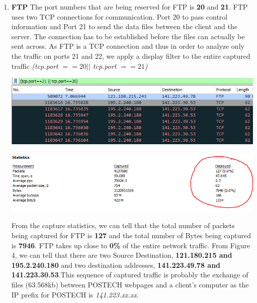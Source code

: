 \documentclass[a4paper,11pt]{article}
\begin{document}
\begin{enumerate}
	\item \textbf{FTP}
	\newline
	The port numbers that are being reserved for FTP is \textbf{20} and \textbf{21}. FTP uses two TCP connections for communication. Port 20 to pass control information and Port 21 to send the data files between the client and the server. The connection has to be established before the files can actually be sent across. As FTP is a TCP connection and thus in order to analyze only the traffic on ports 21 and 22, we apply a display filter to the entire captured traffic \textit{(tcp.port $== 20 || $ tcp.port $== 21$)}\newline
	\begin{minipage}{3in}
	\centering
		\includegraphics[width = 16cm]{ftpfilter}
		\captionsetup{justification=centering}
	\end{minipage}
	\newline\newline
	\begin{minipage}{5in}
	\centering
		\includegraphics[width = 16cm]{ftppacketsnbytes}
		\captionsetup{justification=centering}
	\end{minipage}
\newline\newline
	From the capture statistics, we can tell that the total number of packets being captured for FTP is \textbf{127} and the total number of Bytes being captured is \textbf{7946}. FTP takes up close to \textbf{0\%} of the entire network traffic.  From Figure 4, we can tell that there are two Source Destination, \textbf{121.180.215 and 195.2.240.180} and two destination addresses, \textbf{141.223.49.78 and 141.223.30.53}.This sequence of captured traffic is probably the exchange of files (63.568kb) between POSTECH webpages and a client's computer as the IP prefix for POSTECH is \textit{141.223.xx.xx}.

\end{enumerate}
\end{document}
